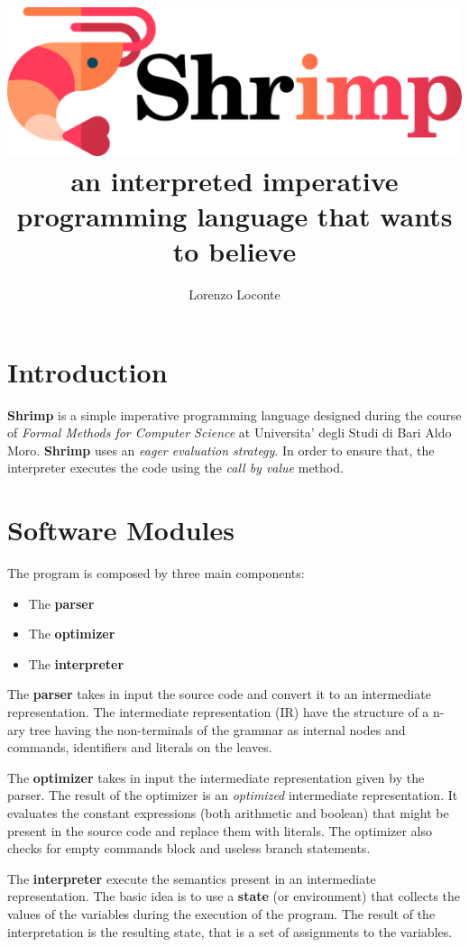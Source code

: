 \documentclass[12pt,a4paper]{article}
\date{}
\title{
    \includegraphics[width=0.67\linewidth]{logo.pdf} \\
    an interpreted imperative programming language that wants to believe
}
\author{Lorenzo Loconte}
\begin{document}
\maketitle

\section*{Introduction}
\textbf{Shrimp} is a simple imperative programming language designed during the course of \textit{Formal Methods for Computer Science} at Universita' degli Studi di Bari Aldo Moro.
\textbf{Shrimp} uses an \textit{eager evaluation strategy}.
In order to ensure that, the interpreter executes the code using the \textit{call by value} method.

\clearpage

\section*{Software Modules}
The program is composed by three main components:
\begin{itemize}
    \item The \textbf{parser}
    \item The \textbf{optimizer}
    \item The \textbf{interpreter}
\end{itemize}

The \textbf{parser} takes in input the source code and convert it to an intermediate representation.
The intermediate representation (IR) have the structure of a n-ary tree having the non-terminals of the grammar as internal nodes and commands, identifiers and literals on the leaves.

The \textbf{optimizer} takes in input the intermediate representation given by the parser.
The result of the optimizer is an \textit{optimized} intermediate representation.
It evaluates the constant expressions (both arithmetic and boolean) that might be present in the source code and replace them with literals.
The optimizer also checks for empty commands block and useless branch statements.

The \textbf{interpreter} execute the semantics present in an intermediate representation.
The basic idea is to use a \textbf{state} (or environment) that collects the values of the variables during the execution of the program.
The result of the interpretation is the resulting state, that is a set of assignments to the variables.

\clearpage
\end{document}
